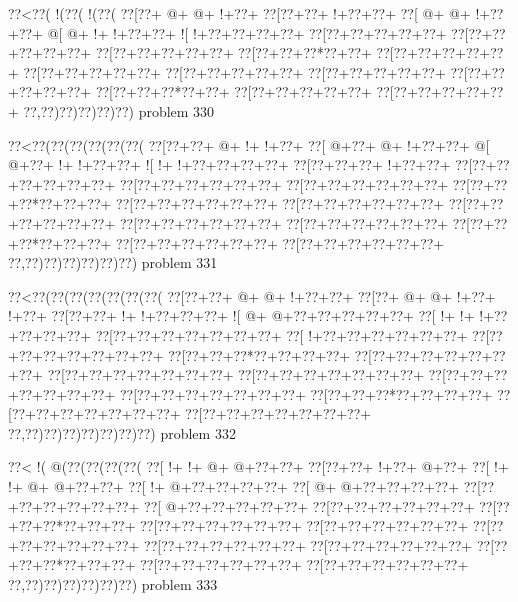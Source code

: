 \vbox{\vbox{\goo
\0??<\0??(\- !(\0??(\- !(\0??(
\0??[\0??+\- @+\- @+\- !+\0??+
\0??[\0??+\0??+\- !+\0??+\0??+
\0??[\- @+\- @+\- !+\0??+\0??+
\- @[\- @+\- !+\- !+\0??+\0??+
\- ![\- !+\0??+\0??+\0??+\0??+
\0??[\0??+\0??+\0??+\0??+\0??+
\0??[\0??+\0??+\0??+\0??+\0??+
\0??[\0??+\0??+\0??+\0??+\0??+
\0??[\0??+\0??+\0??*\0??+\0??+
\0??[\0??+\0??+\0??+\0??+\0??+
\0??[\0??+\0??+\0??+\0??+\0??+
\0??[\0??+\0??+\0??+\0??+\0??+
\0??[\0??+\0??+\0??+\0??+\0??+
\0??[\0??+\0??+\0??+\0??+\0??+
\0??[\0??+\0??+\0??*\0??+\0??+
\0??[\0??+\0??+\0??+\0??+\0??+
\0??[\0??+\0??+\0??+\0??+\0??+
\0??,\0??)\0??)\0??)\0??)\0??)
}
\hfil problem 330\hfil\break
}

\vbox{\vbox{\goo
\0??<\0??(\0??(\0??(\0??(\0??(\0??(
\0??[\0??+\0??+\- @+\- !+\- !+\0??+
\0??[\- @+\0??+\- @+\- !+\0??+\0??+
\- @[\- @+\0??+\- !+\- !+\0??+\0??+
\- ![\- !+\- !+\0??+\0??+\0??+\0??+
\0??[\0??+\0??+\0??+\- !+\0??+\0??+
\0??[\0??+\0??+\0??+\0??+\0??+\0??+
\0??[\0??+\0??+\0??+\0??+\0??+\0??+
\0??[\0??+\0??+\0??+\0??+\0??+\0??+
\0??[\0??+\0??+\0??*\0??+\0??+\0??+
\0??[\0??+\0??+\0??+\0??+\0??+\0??+
\0??[\0??+\0??+\0??+\0??+\0??+\0??+
\0??[\0??+\0??+\0??+\0??+\0??+\0??+
\0??[\0??+\0??+\0??+\0??+\0??+\0??+
\0??[\0??+\0??+\0??+\0??+\0??+\0??+
\0??[\0??+\0??+\0??*\0??+\0??+\0??+
\0??[\0??+\0??+\0??+\0??+\0??+\0??+
\0??[\0??+\0??+\0??+\0??+\0??+\0??+
\0??,\0??)\0??)\0??)\0??)\0??)\0??)
}
\hfil problem 331\hfil\break
}

\vbox{\vbox{\goo
\0??<\0??(\0??(\0??(\0??(\0??(\0??(\0??(
\0??[\0??+\0??+\- @+\- @+\- !+\0??+\0??+
\0??[\0??+\- @+\- @+\- !+\0??+\- !+\0??+
\0??[\0??+\0??+\- !+\- !+\0??+\0??+\0??+
\- ![\- @+\- @+\0??+\0??+\0??+\0??+\0??+
\0??[\- !+\- !+\- !+\0??+\0??+\0??+\0??+
\0??[\0??+\0??+\0??+\0??+\0??+\0??+\0??+
\0??[\- !+\0??+\0??+\0??+\0??+\0??+\0??+
\0??[\0??+\0??+\0??+\0??+\0??+\0??+\0??+
\0??[\0??+\0??+\0??*\0??+\0??+\0??+\0??+
\0??[\0??+\0??+\0??+\0??+\0??+\0??+\0??+
\0??[\0??+\0??+\0??+\0??+\0??+\0??+\0??+
\0??[\0??+\0??+\0??+\0??+\0??+\0??+\0??+
\0??[\0??+\0??+\0??+\0??+\0??+\0??+\0??+
\0??[\0??+\0??+\0??+\0??+\0??+\0??+\0??+
\0??[\0??+\0??+\0??*\0??+\0??+\0??+\0??+
\0??[\0??+\0??+\0??+\0??+\0??+\0??+\0??+
\0??[\0??+\0??+\0??+\0??+\0??+\0??+\0??+
\0??,\0??)\0??)\0??)\0??)\0??)\0??)\0??)
}
\hfil problem 332\hfil\break
}

\vbox{\vbox{\goo
\0??<\- !(\- @(\0??(\0??(\0??(\0??(
\0??[\- !+\- !+\- @+\- @+\0??+\0??+
\0??[\0??+\0??+\- !+\0??+\- @+\0??+
\0??[\- !+\- !+\- @+\- @+\0??+\0??+
\0??[\- !+\- @+\0??+\0??+\0??+\0??+
\0??[\- @+\- @+\0??+\0??+\0??+\0??+
\0??[\0??+\0??+\0??+\0??+\0??+\0??+
\0??[\- @+\0??+\0??+\0??+\0??+\0??+
\0??[\0??+\0??+\0??+\0??+\0??+\0??+
\0??[\0??+\0??+\0??*\0??+\0??+\0??+
\0??[\0??+\0??+\0??+\0??+\0??+\0??+
\0??[\0??+\0??+\0??+\0??+\0??+\0??+
\0??[\0??+\0??+\0??+\0??+\0??+\0??+
\0??[\0??+\0??+\0??+\0??+\0??+\0??+
\0??[\0??+\0??+\0??+\0??+\0??+\0??+
\0??[\0??+\0??+\0??*\0??+\0??+\0??+
\0??[\0??+\0??+\0??+\0??+\0??+\0??+
\0??[\0??+\0??+\0??+\0??+\0??+\0??+
\0??,\0??)\0??)\0??)\0??)\0??)\0??)
}
\hfil problem 333\hfil\break
}

